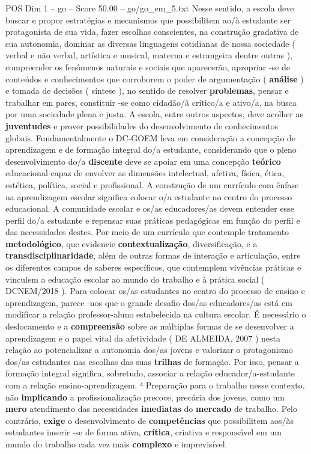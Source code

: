 \begin{textsample}{POS Dim 1 – go – Score 50.00 – go/go\_em\_5.txt}
Nesse sentido, a escola deve buscar e propor estratégias e mecanismos que possibilitem ao/à estudante ser protagonista de sua vida, fazer escolhas conscientes, na construção gradativa de sua autonomia, dominar as diversas linguagens cotidianas de nossa sociedade ( verbal e não verbal, artística e musical, materna e estrangeira dentre outras ), compreender os fenômenos naturais e sociais que aparecerão, apropriar -se de conteúdos e conhecimentos que corroborem o poder de argumentação ( \textbf{análise} ) e tomada de decisões ( síntese ), no sentido de resolver \textbf{problemas}, pensar e trabalhar em pares, constituir -se como cidadão/ã crítico/a e ativo/a, na busca por uma sociedade plena e justa.
A escola, entre outros aspectos, deve acolher as \textbf{juventudes} e prover possibilidades do desenvolvimento de conhecimentos globais.
Fundamentalmente o DC-GOEM leva em consideração a concepção de aprendizagem e de formação integral do/a estudante, considerando que o pleno desenvolvimento do/a \textbf{discente} deve se apoiar em uma concepção \textbf{teórico} educacional capaz de envolver as dimensões intelectual, afetiva, física, ética, estética, política, social e profissional.
A construção de um currículo com ênfase na aprendizagem escolar significa colocar o/a estudante no centro do processo educacional.
A comunidade escolar e os/as educadores/as devem entender esse perfil do/a estudante e repensar suas práticas pedagógicas em função do perfil e das necessidades destes.
Por meio de um currículo que contemple tratamento \textbf{metodológico}, que evidencie \textbf{contextualização}, diversificação, e a \textbf{transdisciplinaridade}, além de outras formas de interação e articulação, entre os diferentes campos de saberes específicos, que contemplem vivências práticas e vinculem a educação escolar ao mundo do trabalho e à prática social ( DCNEM/2018 ).
Para colocar os/as estudantes no centro do processo de ensino e aprendizagem, parece -nos que o grande desafio dos/as educadores/as está em modificar a relação professor-aluno estabelecida na cultura escolar.
É necessário o deslocamento e a \textbf{compreensão} sobre as múltiplas formas de se desenvolver a aprendizagem e o papel vital da afetividade ( DE ALMEIDA, 2007 ) nesta relação ao potencializar a autonomia dos/as jovens e valorizar o protagonismo dos/as estudantes nas escolhas das suas \textbf{trilhas} de formação.
Por isso, pensar a formação integral significa, sobretudo, associar a relação educador/a-estudante com a relação ensino-aprendizagem. ⁴ Preparação para o trabalho nesse contexto, não \textbf{implicando} a profissionalização precoce, precária dos jovens, como um \textbf{mero} atendimento das necessidades \textbf{imediatas} do \textbf{mercado} de trabalho.
Pelo contrário, \textbf{exige} o desenvolvimento de \textbf{competências} que possibilitem aos/às estudantes inserir -se de forma ativa, \textbf{crítica}, criativa e responsável em um mundo do trabalho cada vez mais \textbf{complexo} e imprevisível.


\end{textsample}
